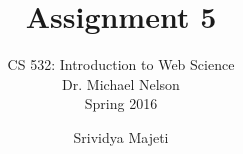 \documentclass[envcountsame,envcountchap]{svmono}
\begin{document}
\author{Srividya Majeti}
\title{Assignment 5}

\subtitle{CS 532:  Introduction to Web Science\\Dr. Michael Nelson\\Spring 2016}

\maketitle

\frontmatter

\tableofcontents

\mainmatter




\backmatter
{}
\nocite{*}

\end{document}
